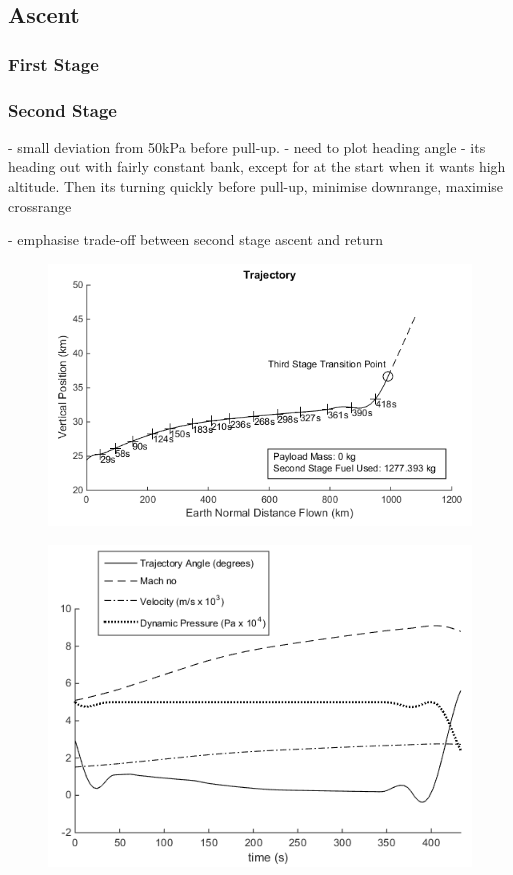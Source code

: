 \documentclass[journal]{new-aiaa} %
\begin{document}
\subsection{Ascent}

\subsubsection{First Stage}

\subsubsection{Second Stage}

- small deviation from 50kPa before pull-up.
- need to plot heading angle 
- its heading out with fairly constant bank, except for at the start when it wants high altitude.  Then its turning quickly before pull-up, minimise downrange, maximise crossrange 


- emphasise trade-off between second stage ascent and return

\begin{figure}
	\centering
	\includegraphics[width=0.7\linewidth]{Figures/AscentTraj}
	\caption{}
	\label{fig:ascenttraj}
\end{figure}

\begin{figure}
	\centering
	\includegraphics[width=0.7\linewidth]{Figures/AscentAero}
	\caption{}
	\label{fig:ascentaero}
\end{figure}
\end{document}
